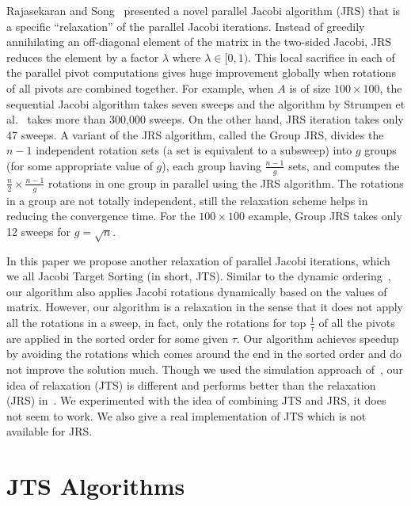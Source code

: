 \documentclass[10pt, conference, compsocconf]{IEEEtran}
\begin{document}
Rajasekaran and Song~\cite{rajasekaran2008relaxation} presented a novel parallel Jacobi algorithm (JRS) that is a specific “relaxation” of the parallel Jacobi iterations. Instead of greedily annihilating an off-diagonal element of the matrix in the two-sided Jacobi, JRS reduces the element by a factor $\lambda$ where $\lambda \in [0,1)$. This local sacrifice in each of the parallel pivot computations gives huge improvement globally when rotations of all pivots are combined together. For example, when $A$ is of size $100 \times 100$, the sequential Jacobi algorithm takes seven sweeps and the algorithm by Strumpen et al.~\cite{strumpen2003stream} takes more than 300,000 sweeps. On the other hand, JRS iteration takes only 47 sweeps. A variant of the JRS algorithm, called the Group JRS, divides the $n-1$ independent rotation sets (a set is equivalent to a subsweep) into $g$ groups (for some appropriate value of $g$), each group having $\frac{n-1}{g}$ sets, and computes the $\frac{n}{2} \times \frac{n-1}{g}$ rotations in one group in parallel using the JRS algorithm. The rotations in a group are not totally independent, still the relaxation  scheme helps in reducing the convergence time. For the $100 \times 100$ example, Group JRS takes only 12 sweeps for $g = \sqrt{n}$.

In this paper we propose another relaxation of parallel Jacobi iterations, which we all Jacobi Target Sorting (in short, JTS). Similar to the dynamic ordering~\cite{bevcka2002dynamic}, our algorithm also applies Jacobi rotations dynamically based on the values of matrix. However, our algorithm is a relaxation in the sense that it does not apply all the rotations in a sweep, in fact, only the rotations for top $\frac{1}{\tau}$ of all the pivots are applied in the sorted order for some given $\tau$. Our algorithm achieves speedup by avoiding the rotations which comes around the end in the sorted order and do not improve the solution much. Though we used the simulation approach of~\cite{rajasekaran2008relaxation}, our idea of relaxation (JTS) is different and performs better than the relaxation (JRS) in~\cite{rajasekaran2008relaxation}. We experimented with the idea of combining JTS and JRS, it does not seem to work. We also give a real implementation of JTS which is not available for JRS.

\section{JTS Algorithms}
\label{sec:jts}
\end{document}
